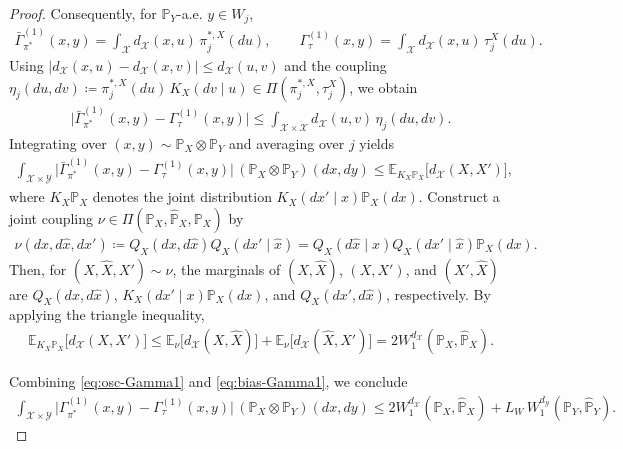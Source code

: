 \documentclass{article}
\theoremstyle{plain}
\theoremstyle{definition}
\theoremstyle{remark}
\begin{document}
\begin{proof}
	Consequently, for $\mathbb{P}_Y$-a.e. $y\in W_j$,
	\begin{align*}
		\bar{\Gamma}_{\pi^*}^{(1)}(x,y)
		= \int_{\mathcal{X}} d_{\mathcal{X}}(x,u)\,\pi^{*,X}_j(du),
		\qquad
		\Gamma_{\tau}^{(1)}(x,y)
		= \int_{\mathcal{X}} d_{\mathcal{X}}(x,u)\,\tau^X_j(du).
	\end{align*}
	Using $|d_{\mathcal{X}}(x,u)-d_{\mathcal{X}}(x,v)|\le d_{\mathcal{X}}(u,v)$ and the coupling
	$\eta_j(du,dv)\coloneqq \pi^{*,X}_j(du)\,K_X(dv\mid u)\in\Pi(\pi^{*,X}_j,\tau^X_j)$,
	we obtain
	\begin{align*}
		\big|\bar{\Gamma}_{\pi^*}^{(1)}(x,y)-\Gamma_{\tau}^{(1)}(x,y)\big|
		\le \int_{\mathcal{X}\times\mathcal{X}} d_{\mathcal{X}}(u,v)\,\eta_j(du,dv).
	\end{align*}
	Integrating over $(x,y)\sim \mathbb{P}_X\otimes\mathbb{P}_Y$ and averaging over $j$ yields
	\begin{align*}
		\int_{\mathcal{X}\times\mathcal{Y}}
		\big|\bar{\Gamma}_{\pi^*}^{(1)}(x,y)-\Gamma_{\tau}^{(1)}(x,y)\big|\,
		(\mathbb{P}_X\otimes\mathbb{P}_Y)(dx,dy)
		\le \mathbb{E}_{K_X\mathbb{P}_X}\!\big[d_{\mathcal{X}}(X,X')\big] ,
	\end{align*}
	where $K_X\mathbb{P}_X$ denotes the joint distribution $K_X(dx'\mid x)\mathbb{P}_X(dx)$. Construct a joint coupling $\nu \in \Pi(\mathbb{P}_X,\hat{\mathbb{P}}_X,\mathbb{P}_X)$ by
	\begin{align*}
		\nu(dx,d\hat{x},dx') \coloneqq Q_X(dx,d\hat{x}) Q_X(dx' \mid \hat{x}) = Q_X(d\hat{x} \mid x)Q_X(dx' \mid \hat{x})\mathbb{P}_X(dx) . 
	\end{align*}
	Then, for $(X,\hat{X},X') \sim \nu$, the marginals of $(X,\hat{X})$, $(X,X')$, and $(X',\hat{X})$ are $Q_X(dx,d\hat{x})$, $K_X(dx' \mid x)\mathbb{P}_X(dx)$, and $Q_X(dx',d\hat{x})$,
	respectively. By applying the triangle inequality,
	\begin{align}
		\label{eq:bias-Gamma1}
		\mathbb{E}_{K_X\mathbb{P}_X}\!\big[d_{\mathcal{X}}(X,X')\big] \leq \mathbb{E}_{\nu}\!\big[d_{\mathcal{X}}(X,\hat{X})\big] + \mathbb{E}_{\nu}\!\big[d_{\mathcal{X}}(\hat{X},X')\big] = 2W_1^{d_{\mathcal{X}}}(\mathbb{P}_X,\hat{\mathbb{P}}_X) .
	\end{align}
	
	Combining \eqref{eq:osc-Gamma1} and \eqref{eq:bias-Gamma1}, we conclude
	\begin{align*}
		\int_{\mathcal{X}\times\mathcal{Y}}
		\big|\Gamma_{\pi^*}^{(1)}(x,y)-\Gamma_{\tau}^{(1)}(x,y)\big|\,
		(\mathbb{P}_X\otimes\mathbb{P}_Y)(dx,dy)
		\le 2W_1^{d_{\mathcal{X}}}(\mathbb{P}_X,\hat{\mathbb{P}}_X)
		+ L_W\,W_1^{d_{\mathcal{Y}}}(\mathbb{P}_Y,\hat{\mathbb{P}}_Y).
	\end{align*}
	

\end{proof}
\end{document}
